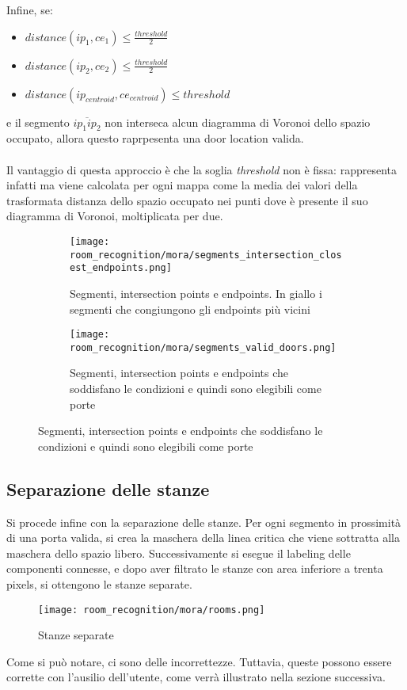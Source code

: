 Infine, se:
\begin{itemize}
  \item $distance(ip_1, ce_1) \leq \frac{threshold}{2}$
  \item $distance(ip_2, ce_2) \leq \frac{threshold}{2}$
  \item $distance(ip_{centroid}, ce_{centroid}) \leq threshold$
\end{itemize}
e il segmento $\overline{ip_1ip_2}$ non interseca alcun diagramma di Voronoi dello spazio occupato, allora questo raprpesenta una door location valida.\\\\
Il vantaggio di questa approccio è che la soglia \textit{threshold} non è fissa: rappresenta infatti ma viene calcolata per ogni mappa come la media dei valori della trasformata distanza dello spazio occupato nei punti dove è presente il suo diagramma di Voronoi, moltiplicata per due.
\begin{figure}
  \centering
  \begin{subfigure}[t]{0.45\textwidth}
    \centering
    \texttt{[image: room\_recognition/mora/segments\_intersection\_closest\_endpoints.png]}
    \caption{Segmenti, intersection points e endpoints. In giallo i segmenti che congiungono gli endpoints più vicini}
  \end{subfigure}
  \begin{subfigure}[t]{0.45\textwidth}
    \centering
    \texttt{[image: room\_recognition/mora/segments\_valid\_doors.png]}
    \caption{Segmenti, intersection points e endpoints che soddisfano le condizioni e quindi sono elegibili come porte}
  \end{subfigure}
\end{figure}
\subsection{Separazione delle stanze}
Si procede infine con la separazione delle stanze. Per ogni segmento in prossimità di una porta valida, si crea la maschera della linea critica che viene sottratta alla maschera dello spazio libero. Successivamente si esegue il labeling delle componenti connesse, e dopo aver filtrato le stanze con area inferiore a trenta pixels, si ottengono le stanze separate.
\begin{figure}[H]
  \centering
  \texttt{[image: room\_recognition/mora/rooms.png]}
  \caption{Stanze separate}
\end{figure}
Come si può notare, ci sono delle incorrettezze. Tuttavia, queste possono essere corrette con l'ausilio dell'utente, come verrà illustrato nella sezione successiva.

